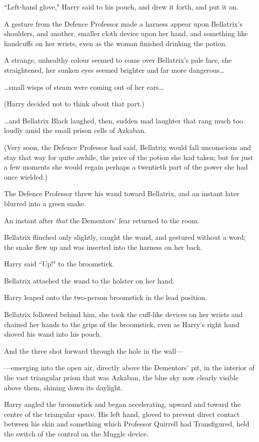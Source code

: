 ``Left-hand glove," Harry said to his pouch, and drew it forth, and put it on.

A gesture from the Defence Professor made a harness appear upon Bellatrix's shoulders, and another, smaller cloth device upon her hand, and something like handcuffs on her wrists, even as the woman finished drinking the potion.

A strange, unhealthy colour seemed to come over Bellatrix's pale face, she straightened, her sunken eyes seemed brighter and far more dangerous{\ldots}

{\ldots}small wisps of steam were coming out of her ears{\ldots}

(Harry decided not to think about that part.)

{\ldots}and Bellatrix Black laughed, then, sudden mad laughter that rang much too loudly amid the small prison cells of Azkaban.

(Very soon, the Defence Professor had said, Bellatrix would fall unconscious and stay that way for quite awhile, the price of the potion she had taken; but for just a few moments she would regain perhaps a twentieth part of the power she had once wielded.)

The Defence Professor threw his wand toward Bellatrix, and an instant later blurred into a green snake.

An instant after \emph{that} the Dementors' fear returned to the room.

Bellatrix flinched only slightly, caught the wand, and gestured without a word; the snake flew up and was inserted into the harness on her back.

Harry said ``Up!" to the broomstick.

Bellatrix attached the wand to the holster on her hand.

Harry leaped onto the two-person broomstick in the lead position.

Bellatrix followed behind him, she took the cuff-like devices on her wrists and chained her hands to the grips of the broomstick, even as Harry's right hand shoved his wand into his pouch.

And the three shot forward through the hole in the wall—

—emerging into the open air, directly above the Dementors' pit, in the interior of the vast triangular prism that was Azkaban, the blue sky now clearly visible above them, shining down its daylight.

Harry angled the broomstick and began accelerating, upward and toward the centre of the triangular space. His left hand, gloved to prevent direct contact between his skin and something which Professor Quirrell had Transfigured, held the switch of the control on the Muggle device.

